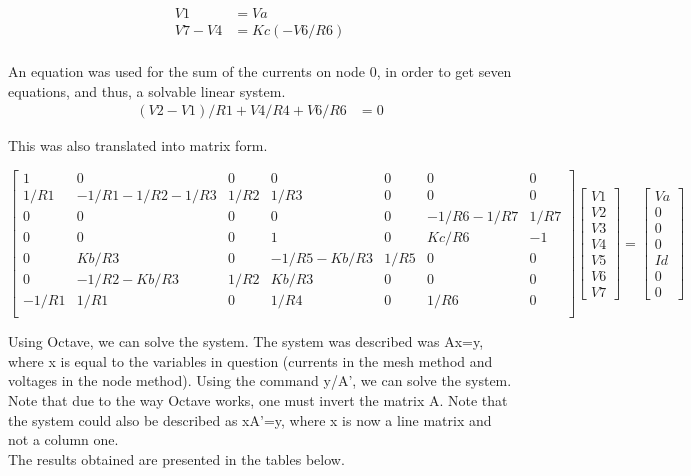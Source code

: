 \begin{align*} 
V1&=Va \\ V7-V4&=Kc(-V6/R6)\\
\end{align*}

An equation was used for the sum of the currents on node 0, in order to get seven equations, and thus, a solvable linear system.
\begin{align*} 
(V2-V1)/R1+V4/R4+V6/R6&=0
\end{align*}
 
This was also translated into matrix form.

$$
\begin{bmatrix} 
   1     & 0               & 0    & 0           & 0    & 0          & 0    \\
   1/R1  & -1/R1-1/R2-1/R3 & 1/R2 & 1/R3        & 0    & 0          & 0    \\
   0     & 0               & 0    & 0           & 0    & -1/R6-1/R7 & 1/R7 \\
   0     & 0               & 0    & 1           & 0    & Kc/R6      & -1   \\
   0     & Kb/R3           & 0    & -1/R5-Kb/R3 & 1/R5 & 0          & 0    \\
   0     & -1/R2-Kb/R3     & 1/R2 & Kb/R3       & 0    & 0          & 0    \\
   -1/R1 & 1/R1            & 0    & 1/R4        & 0    & 1/R6       & 0    \\
\end {bmatrix} 
\begin{bmatrix}
V1 \\ V2 \\ V3 \\ V4 \\ V5 \\ V6 \\ V7
\end{bmatrix}
=
\begin{bmatrix}
Va \\ 0 \\ 0 \\ 0 \\ Id \\ 0 \\ 0
\end{bmatrix}
$$

Using Octave, we can solve the system. The system was described was Ax=y, where x is equal to the variables in question (currents in the mesh method and voltages in the node method). Using the command y/A', we can solve the system. Note that due to the way Octave works, one must invert the matrix A. Note that the system could also be described as xA'=y, where x is now a line matrix and not a column one.\\
The results obtained are presented in the tables below.

